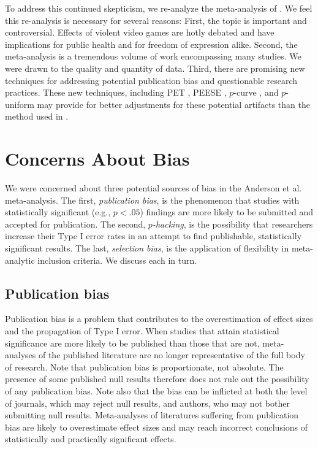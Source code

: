 \documentclass[man, mask]{apa6}
\begin{document}
To address this continued skepticism, we re-analyze the meta-analysis of \citet{Anderson:etal:2010}. We feel this re-analysis is necessary for several reasons:  First, the topic is important and controversial. Effects of violent video games are hotly debated and have implications for public health and for freedom of expression alike. Second, the \citet{Anderson:etal:2010} meta-analysis is a tremendous volume of work encompassing many studies. We were drawn to the quality and quantity of data. Third, there are promising new techniques for addressing potential publication bias and questionable research practices.  These new techniques, including PET \citep[Precision-Effect Test,][]{Stanley:Doucouliagos:2014}, PEESE \citep[Precision-Effect Estimate with Standard Error,][]{Stanley:Doucouliagos:2014}, $p$-curve \citep{Simonsohn:etal:2014,Simonsohn:etal:2014b}, and $p$-uniform \citet{van Assen:etal:2015} may provide for better adjustments for these potential artifacts than the method used in \citet{Anderson:etal:2010}. 

\section{Concerns About Bias}
We were concerned about three potential sources of bias in the Anderson et al. meta-analysis. The first, {\em publication bias}, is the phenomenon that studies with statistically significant (e.g., $p<.05$) findings are more likely to be submitted and accepted for publication. The second, {\em $p$-hacking}, is the possibility that researchers increase their Type I error rates in an attempt to find publishable, statistically significant results. The last, {\em selection bias}, is the application of flexibility in meta-analytic inclusion criteria. We discuss each in turn.

\subsection{Publication bias}
Publication bias is a problem that contributes to the overestimation of effect sizes and the propagation of Type I error. When studies that attain statistical significance are more likely to be published than those that are not, meta-analyses of the published literature are no longer representative of the full body of research. Note that publication bias is proportionate, not absolute. The presence of some published null results therefore does not rule out the possibility of any publication bias. Note also that the bias can be inflicted at both the level of journals, which may reject null results, and authors, who may not bother submitting null results.
Meta-analyses of literatures suffering from publication bias are likely to overestimate effect sizes and may reach incorrect conclusions of statistically and practically significant effects.
\end{document}
